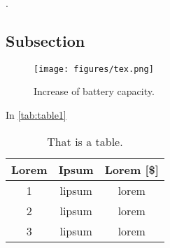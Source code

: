 
\lipsum[2-4] \cite{china_too_many}. 

\subsection{Subsection}
\lipsum[5]

\begin{figure}[H]
    \centering
    \texttt{[image: figures/tex.png]}
    \caption{Increase of battery capacity. \cite{china_too_many}}
    \label{fig:batteryIncreas}
\end{figure}

\lipsum[6-7]

In \autoref{tab:table1}

\begin{table}[H]
    \centering
    \caption{That is a table.}
    \begin{tabular}{|c|c|c|}
    \centering
    \textbf{Lorem} & \textbf{Ipsum} & \textbf{Lorem [\$]} \\ \hline \hline
1   & lipsum    & lorem     \\ \hline   
2   & lipsum    & lorem   \\ \hline
3   & lipsum    & lorem  
    \end{tabular}
    \label{tab:table1}
\end{table}

\lipsum[8]